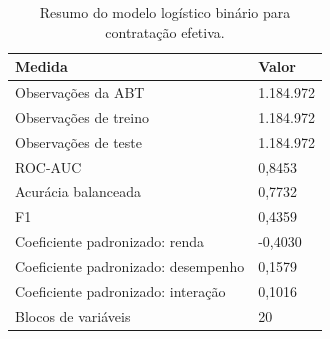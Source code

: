 \begin{table}
\caption{Resumo do modelo logístico binário para contratação efetiva.}
\label{tab:tabela_logit_binario_principal_geral_in_sample_e5}
\begin{tabular}{ll}
\toprule
Medida & Valor \\
\midrule
Observações da ABT & 1.184.972 \\
Observações de treino & 1.184.972 \\
Observações de teste & 1.184.972 \\
ROC-AUC & 0,8453 \\
Acurácia balanceada & 0,7732 \\
F1 & 0,4359 \\
Coeficiente padronizado: renda & -0,4030 \\
Coeficiente padronizado: desempenho & 0,1579 \\
Coeficiente padronizado: interação & 0,1016 \\
Blocos de variáveis & 20 \\
\bottomrule
\end{tabular}
\end{table}

